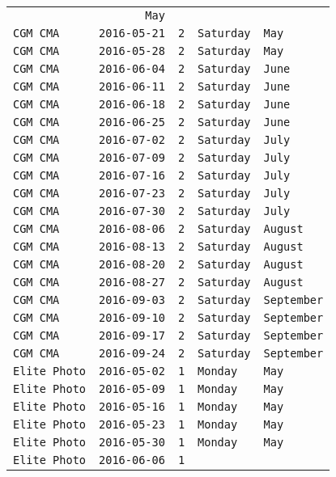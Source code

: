 \documentclass[11pt,A4paper,]{article}
\begin{document}
\begin{longtable}[]{@{}lrrll@{}}
& \texttt{May}\tabularnewline
\texttt{CGM\ CMA} & \texttt{2016-05-21} & \texttt{2} & \texttt{Saturday}
& \texttt{May}\tabularnewline
\texttt{CGM\ CMA} & \texttt{2016-05-28} & \texttt{2} & \texttt{Saturday}
& \texttt{May}\tabularnewline
\texttt{CGM\ CMA} & \texttt{2016-06-04} & \texttt{2} & \texttt{Saturday}
& \texttt{June}\tabularnewline
\texttt{CGM\ CMA} & \texttt{2016-06-11} & \texttt{2} & \texttt{Saturday}
& \texttt{June}\tabularnewline
\texttt{CGM\ CMA} & \texttt{2016-06-18} & \texttt{2} & \texttt{Saturday}
& \texttt{June}\tabularnewline
\texttt{CGM\ CMA} & \texttt{2016-06-25} & \texttt{2} & \texttt{Saturday}
& \texttt{June}\tabularnewline
\texttt{CGM\ CMA} & \texttt{2016-07-02} & \texttt{2} & \texttt{Saturday}
& \texttt{July}\tabularnewline
\texttt{CGM\ CMA} & \texttt{2016-07-09} & \texttt{2} & \texttt{Saturday}
& \texttt{July}\tabularnewline
\texttt{CGM\ CMA} & \texttt{2016-07-16} & \texttt{2} & \texttt{Saturday}
& \texttt{July}\tabularnewline
\texttt{CGM\ CMA} & \texttt{2016-07-23} & \texttt{2} & \texttt{Saturday}
& \texttt{July}\tabularnewline
\texttt{CGM\ CMA} & \texttt{2016-07-30} & \texttt{2} & \texttt{Saturday}
& \texttt{July}\tabularnewline
\texttt{CGM\ CMA} & \texttt{2016-08-06} & \texttt{2} & \texttt{Saturday}
& \texttt{August}\tabularnewline
\texttt{CGM\ CMA} & \texttt{2016-08-13} & \texttt{2} & \texttt{Saturday}
& \texttt{August}\tabularnewline
\texttt{CGM\ CMA} & \texttt{2016-08-20} & \texttt{2} & \texttt{Saturday}
& \texttt{August}\tabularnewline
\texttt{CGM\ CMA} & \texttt{2016-08-27} & \texttt{2} & \texttt{Saturday}
& \texttt{August}\tabularnewline
\texttt{CGM\ CMA} & \texttt{2016-09-03} & \texttt{2} & \texttt{Saturday}
& \texttt{September}\tabularnewline
\texttt{CGM\ CMA} & \texttt{2016-09-10} & \texttt{2} & \texttt{Saturday}
& \texttt{September}\tabularnewline
\texttt{CGM\ CMA} & \texttt{2016-09-17} & \texttt{2} & \texttt{Saturday}
& \texttt{September}\tabularnewline
\texttt{CGM\ CMA} & \texttt{2016-09-24} & \texttt{2} & \texttt{Saturday}
& \texttt{September}\tabularnewline
\texttt{Elite\ Photo} & \texttt{2016-05-02} & \texttt{1} &
\texttt{Monday} & \texttt{May}\tabularnewline
\texttt{Elite\ Photo} & \texttt{2016-05-09} & \texttt{1} &
\texttt{Monday} & \texttt{May}\tabularnewline
\texttt{Elite\ Photo} & \texttt{2016-05-16} & \texttt{1} &
\texttt{Monday} & \texttt{May}\tabularnewline
\texttt{Elite\ Photo} & \texttt{2016-05-23} & \texttt{1} &
\texttt{Monday} & \texttt{May}\tabularnewline
\texttt{Elite\ Photo} & \texttt{2016-05-30} & \texttt{1} &
\texttt{Monday} & \texttt{May}\tabularnewline
\texttt{Elite\ Photo} & \texttt{2016-06-06} & \texttt{1} &

\end{longtable}
\end{document}
